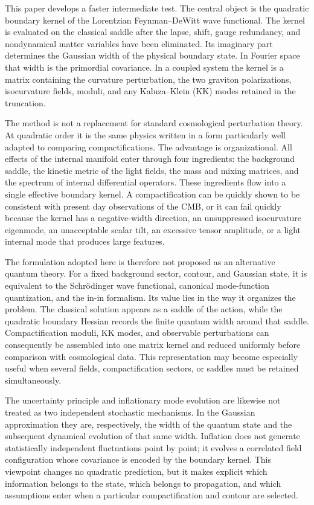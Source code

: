 \documentclass[aps,prd,twocolumn,superscriptaddress,nofootinbib,longbibliography]{revtex4-2}
\begin{document}
This paper develops a faster intermediate test. The central object is the quadratic boundary kernel of the Lorentzian Feynman--DeWitt wave functional. The kernel is evaluated on the classical saddle after the lapse, shift, gauge redundancy, and nondynamical matter variables have been eliminated. Its imaginary part determines the Gaussian width of the physical boundary state. In Fourier space that width is the primordial covariance. In a coupled system the kernel is a matrix containing the curvature perturbation, the two graviton polarizations, isocurvature fields, moduli, and any Kaluza--Klein (KK) modes retained in the truncation.

The method is not a replacement for standard cosmological perturbation theory. At quadratic order it is the same physics written in a form particularly well adapted to comparing compactifications. The advantage is organizational. All effects of the internal manifold enter through four ingredients: the background saddle, the kinetic metric of the light fields, the mass and mixing matrices, and the spectrum of internal differential operators. These ingredients flow into a single effective boundary kernel. A compactification can be quickly shown to be consistent with present day observations of the CMB, or it can fail quickly because the kernel has a negative-width direction, an unsuppressed isocurvature eigenmode, an unacceptable scalar tilt, an excessive tensor amplitude, or a light internal mode that produces large features.

The formulation adopted here is therefore not proposed as an alternative quantum theory. For a fixed background sector, contour, and Gaussian state, it is equivalent to the Schrödinger wave functional, canonical mode-function quantization, and the in-in formalism. Its value lies in the way it organizes the problem. The classical solution appears as a saddle of the action, while the quadratic boundary Hessian records the finite quantum width around that saddle. Compactification moduli, KK modes, and observable perturbations can consequently be assembled into one matrix kernel and reduced uniformly before comparison with cosmological data. This representation may become especially useful when several fields, compactification sectors, or saddles must be retained simultaneously.

The uncertainty principle and inflationary mode evolution are likewise not treated as two independent stochastic mechanisms. In the Gaussian approximation they are, respectively, the width of the quantum state and the subsequent dynamical evolution of that same width. Inflation does not generate statistically independent fluctuations point by point; it evolves a correlated field configuration whose covariance is encoded by the boundary kernel. This viewpoint changes no quadratic prediction, but it makes explicit which information belongs to the state, which belongs to propagation, and which assumptions enter when a particular compactification and contour are selected.
\end{document}
